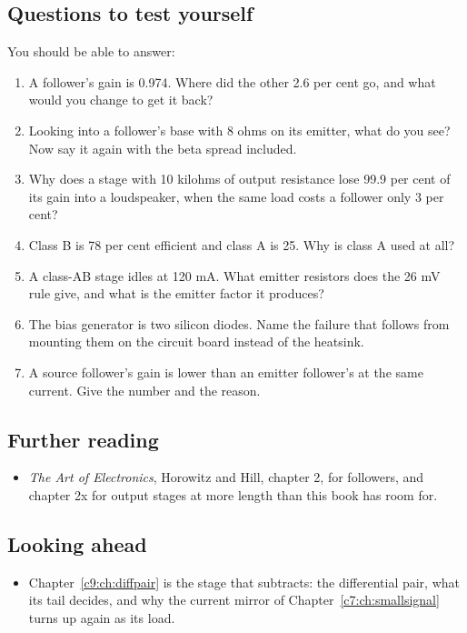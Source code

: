 \subsection*{Questions to test yourself}
You should be able to answer:
\begin{enumerate}
  \item A follower's gain is 0.974. Where did the other 2.6 per cent go, and what would you change to get it back?
  \item Looking into a follower's base with 8 ohms on its emitter, what do you see? Now say it again with the beta spread included.
  \item Why does a stage with 10 kilohms of output resistance lose 99.9 per cent of its gain into a loudspeaker, when the same load costs a follower only 3 per cent?
  \item Class B is 78 per cent efficient and class A is 25. Why is class A used at all?
  \item A class-AB stage idles at 120 mA. What emitter resistors does the 26 mV rule give, and what is the emitter factor it produces?
  \item The bias generator is two silicon diodes. Name the failure that follows from mounting them on the circuit board instead of the heatsink.
  \item A source follower's gain is lower than an emitter follower's at the same current. Give the number and the reason.
\end{enumerate}

\subsection*{Further reading}
\begin{itemize}
  \item \emph{The Art of Electronics}, Horowitz and Hill, chapter 2, for followers, and chapter 2x for output stages at more length than this book has room for.
\end{itemize}

\subsection*{Looking ahead}
\begin{itemize}
  \item Chapter~\ref{c9:ch:diffpair} is the stage that subtracts: the differential pair, what its tail decides, and why the current mirror of Chapter~\ref{c7:ch:smallsignal} turns up again as its load.
\end{itemize}
